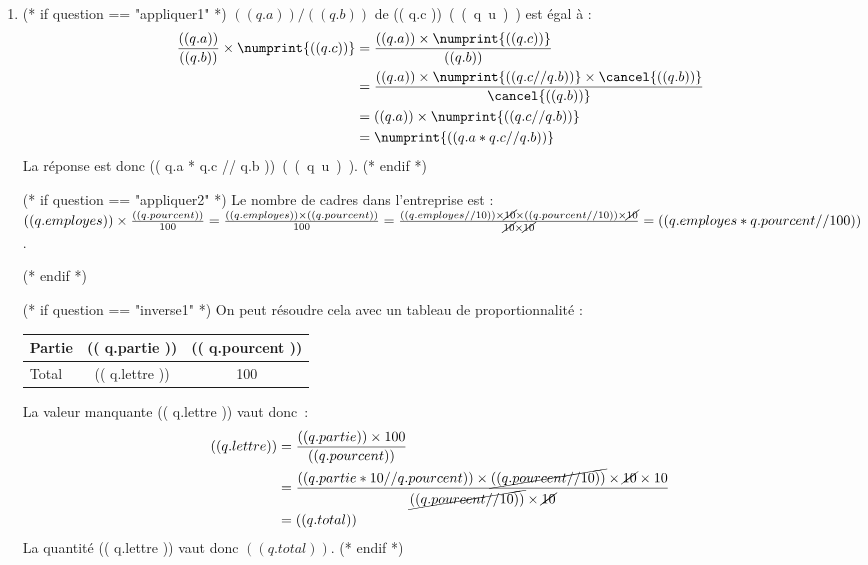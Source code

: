 \exercice*

\begin{enumerate}

    (* for question in questions *)
    (* set q=questions[question] *)
  \item

    (* if question == "appliquer1" *)
    $(( q.a ))/(( q.b ))$ de \SI{(( q.c ))}{(( q.u ))} est égal à :
      \begin{align*}
        \frac{(( q.a ))}{(( q.b ))}\times \numprint{(( q.c ))}
        &=\frac{(( q.a ))\times  \numprint{(( q.c ))}}{(( q.b ))}\\
        &=\frac{(( q.a ))\times \numprint{(( q.c//q.b ))}\times\cancel{(( q.b ))}}{\cancel{(( q.b ))}}\\
        &=(( q.a ))\times \numprint{(( q.c//q.b ))}\\
        &=\numprint{(( q.a * q.c // q.b ))}
      \end{align*}
      La réponse est donc \SI{(( q.a * q.c // q.b ))}{(( q.u ))}.
    (* endif *)

    (* if question == "appliquer2" *)
    Le nombre de cadres dans l'entreprise est : $
  (( q.employes ))\times\frac{(( q.pourcent ))}{100}
  =
  \frac{(( q.employes )) \times (( q.pourcent ))}{100}
  =
  \frac{(( q.employes // 10 )) \times \cancel{10} \times (( q.pourcent // 10 )) \times \cancel{10}}{\cancel{10}\times\cancel{10}}
  =
  (( q.employes * q.pourcent // 100 ))
    $.

    (* endif *)

    (* if question == "inverse1" *)
    On peut résoudre cela avec un tableau de proportionnalité :
    \begin{center}
      \begin{tabular}{|l|c|c|}
        \hline
        Partie & (( q.partie )) & (( q.pourcent )) \\
        \hline
        Total  & (( q.lettre )) & 100\\
        \hline
      \end{tabular}
    \end{center}
    La valeur manquante (( q.lettre )) vaut donc :
    \begin{align*}
      (( q.lettre ))
      &= \frac{(( q.partie )) \times 100}{(( q.pourcent ))} \\
      &= \frac{(( q.partie * 10 // q.pourcent )) \times \cancel{(( q.pourcent // 10 ))} \times \cancel{10} \times 10}{\cancel{(( q.pourcent // 10))} \times \cancel{10}}\\
      &= (( q.total ))
    \end{align*}
    La quantité (( q.lettre )) vaut donc $(( q.total ))$.
    (* endif *)


\end{enumerate}
